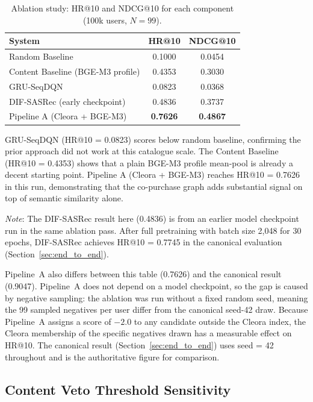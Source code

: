 \begin{table}[H]
\centering
\caption{Ablation study: HR@10 and NDCG@10 for each component (100k users, $N = 99$).}
\label{tab:ablation}
\begin{tabular}{lcc}
\hline
\textbf{System} & \textbf{HR@10} & \textbf{NDCG@10} \\
\hline
Random Baseline                       & 0.1000 & 0.0454 \\
Content Baseline (BGE-M3 profile)     & 0.4353 & 0.3030 \\
GRU-SeqDQN                            & 0.0823 & 0.0368 \\
DIF-SASRec (early checkpoint)         & 0.4836 & 0.3737 \\
Pipeline A (Cleora + BGE-M3)          & \textbf{0.7626} & \textbf{0.4867} \\
\hline
\end{tabular}
\end{table}

GRU-SeqDQN (HR@10 = 0.0823) scores below random baseline, confirming the prior approach did not work at this catalogue scale.
The Content Baseline (HR@10 = 0.4353) shows that a plain BGE-M3 profile mean-pool is already a decent starting point.
Pipeline A (Cleora + BGE-M3) reaches HR@10 = 0.7626 in this run, demonstrating that the co-purchase graph adds substantial signal on top of semantic similarity alone.

\textit{Note}: The DIF-SASRec result here (0.4836) is from an earlier model checkpoint run in the same ablation pass.
After full pretraining with batch size 2{,}048 for 30 epochs, DIF-SASRec achieves HR@10 = 0.7745 in the canonical evaluation (Section~\ref{sec:end_to_end}).

Pipeline~A also differs between this table (0.7626) and the canonical result (0.9047).
Pipeline~A does not depend on a model checkpoint, so the gap is caused by negative sampling: the ablation was run without a fixed random seed, meaning the 99 sampled negatives per user differ from the canonical seed-42 draw.
Because Pipeline~A assigns a score of $-2.0$ to any candidate outside the Cleora index, the Cleora membership of the specific negatives drawn has a measurable effect on HR@10.
The canonical result (Section~\ref{sec:end_to_end}) uses seed = 42 throughout and is the authoritative figure for comparison.

\subsection{Content Veto Threshold Sensitivity}
\label{sec:veto_sensitivity}

